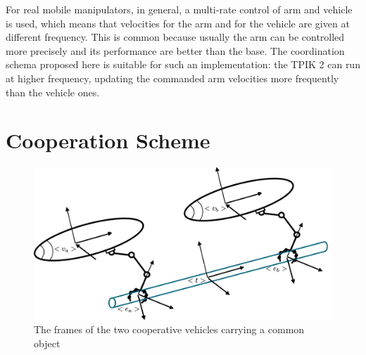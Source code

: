 For real mobile manipulators, in general, a multi-rate control of arm and vehicle is used, which means that velocities for the arm and for the vehicle are given at different frequency. This is common because usually the arm can be controlled more precisely and its performance are better than the base. The coordination schema proposed here is suitable for such an implementation: the TPIK 2 can run at higher frequency, updating the commanded arm velocities more frequently than the vehicle ones.

\section{Cooperation Scheme}
\label{sec:coopScheme}
\begin{figure}[H]
	\begin{center}
		\includegraphics[width=0.8\columnwidth]{coopFrames.jpg}
		\caption[Relevant frames for the cooperation scheme]{The frames of the two cooperative vehicles carrying a common object}\label{fig:coopFrames}
	\end{center}
\end{figure}

